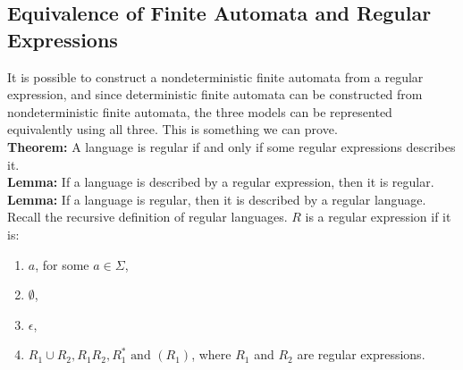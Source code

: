 \documentclass[letterpaper, 12pt]{math}
\begin{document}
\subsection*{Equivalence of Finite Automata and Regular Expressions}
It is possible to construct a nondeterministic finite automata from a regular
expression, and since deterministic finite automata can be constructed from
nondeterministic finite automata, the three models can be represented
equivalently using all three. This is something we can prove. \\
\textbf{Theorem:} A language is regular if and only if some regular expressions
describes it. \\
\textbf{Lemma:} If a language is described by a regular expression, then it is
regular. \\
\textbf{Lemma:} If a language is regular, then it is described by a regular
language. \\
Recall the recursive definition of regular languages. \( R \) is a regular
expression if it is:
\begin{enumerate}
  \item \( a \), for some \( a\in\Sigma \),
  \item \( \emptyset \),
  \item \( \epsilon \),
  \item \( R_1\cup R_2, R_1R_2, R_1^*\text{ and }(R_1) \), where \( R_1 \) and
  \( R_2 \) are regular expressions.
\end{enumerate}
\end{document}
